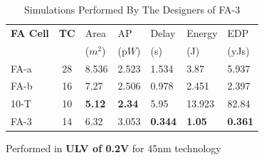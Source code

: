 \documentclass[conference]{IEEEtran}
\begin{document}
\begin{table}[!ht]
	\centering
	\begin{threeparttable}[b]
		\renewcommand{\arraystretch}{1.3}
		\caption{Simulations Performed By The Designers of FA-3}
		\begin{tabular}{p{1cm} c *{5}{l}}
			\hline
			\multicolumn{1}{c}{\bfseries FA Cell } & \bfseries TC & Area                  & AP             & Delay            & Energy         & EDP             \\
			                                       &              & (\textmugreek\(m^2\)) & (p\(W\))       & (\textmugreek s) & (\textalpha J) & (yJs)           \\
			\hline
			\cite{weste2010cmos} FA-a              & 28           & 8.536                 & 2.523          & 1.534            & 3.87           & 5.937           \\
			\cite{15484823} FA-b                   & 16           & 7.27                  & 2.506          & 0.978            & 2.451          & 2.397           \\
			\cite{20194307582820} 10-T             & 10           & \bfseries 5.12        & \bfseries 2.34 & 5.95             & 13.923         & 82.84           \\
			\cite{18743001} FA-3                   & 14           & 6.32                  & 3.053          & \bfseries 0.344  & \bfseries 1.05 & \bfseries 0.361 \\
			\hline
		\end{tabular}
		\begin{tablenotes}
			\item Performed in \textbf{ULV of 0.2V} for 45nm technology
		\end{tablenotes}
		\label{tb:fa3-comparison}
	\end{threeparttable}
\end{table}
\end{document}
